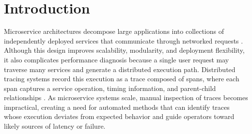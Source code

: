 \documentclass[informatics,article,submit,moreauthors]{Definitions/mdpi}
\begin{document}
\section{Introduction}
\label{sec:introduction}

Microservice architectures decompose large applications into collections of independently deployed services that communicate through networked requests  \cite{dragoni2017microservices}. Although this design improves scalability, modularity, and deployment flexibility, it also complicates performance diagnosis because a single user request may traverse many services and generate a distributed execution path. Distributed tracing systems record this execution as a trace composed of spans, where each span captures a service operation, timing information, and parent-child relationships \cite{sigelman2010dapper}. As microservice systems scale, manual inspection of traces becomes impractical, creating a need for automated methods that can identify traces whose execution deviates from expected behavior and guide operators toward likely sources of latency or failure.
\end{document}
